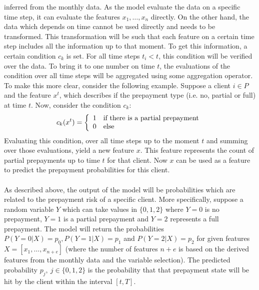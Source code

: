     inferred from the monthly data. As the model evaluate the data on 
    a specific time step, it can evaluate the features 
    $x_1, \ldots, x_n$ directly. On the other hand, the data
    which depends on time cannot be used directly and needs to be 
    transformed. This transformation will be such that each feature 
    on a certain time step includes all the information up to that 
    moment. To get this information, a certain condition $c_k$ is set. 
    For all time steps $t_i < t$, this condition will be verified 
    over the data. To bring it to one number on time $t$, the 
    evaluations of the condition over all time steps will be aggregated 
    using some aggregation operator. To make this more clear, consider 
    the following example. Suppose a client $i \in P$ and the feature 
    $x^t$, which describes if the prepayment type (i.e. no, partial or 
    full) at time $t$. Now, consider the condition $c_k$:
    \begin{equation}
        c_k(x^t) = \left\{
        \begin{array}{l l l l l}
            1 & \text{if there is a partial prepayment} \\ 
            0 & \text{else}
        \end{array}
        \right.
    \end{equation}
    Evaluating this condition, over all time steps up to the moment 
    $t$ and summing over those evaluations, yield a new feature $x$. 
    This feature represents the count of partial prepayments up to time 
    $t$ for that client. Now $x$ can be used as a feature to predict 
    the prepayment probabilities for this client. 
    \\\\
    As described above, the output of the model will be probabilities 
    which are related to the prepayment risk of a specific client. More 
    specifically, suppose a random variable $Y$ which can take values in 
    $\{0, 1, 2\}$ where $Y=0$ is no prepayment, 
    $Y=1$ is a partial prepayment and $Y=2$ represents a full prepayment. 
    The model will return the probabilities 
    $P(Y = 0 | X) = p_0, P(Y = 1 | X) = p_1$ and 
    $P(Y = 2 | X) = p_2$
    for given features $X = [x_1, \ldots, x_{n+e}]$ (where the number of 
    features 
    $n+e$ is based on the derived features from the monthly data and 
    the variable selection). The predicted probability 
    $p_j, \ j \in \{0, 1, 2\}$ is the probability 
    that that prepayment state will be hit by the client within the 
    interval $[t, T]$. 

